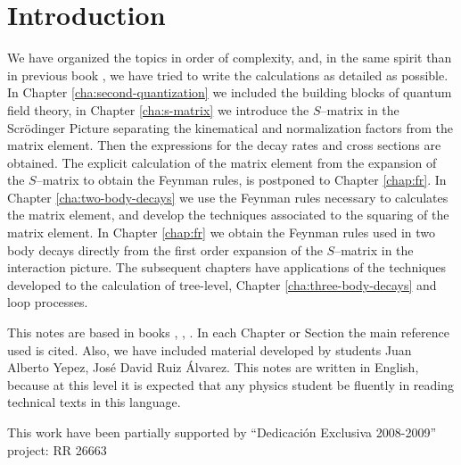 
\chapter{Introduction}
\label{cha:introduction} %
We have organized the topics in order of complexity, and, in the same
spirit than in  previous book \cite{lsm}, we have tried to write the
calculations as detailed as possible. In
Chapter 
\ref{cha:second-quantization} %
we included the building blocks
of quantum field theory, in Chapter 
\ref{cha:s-matrix} %
we introduce
the $S$--matrix in the Scr\"odinger Picture separating the kinematical
and normalization factors from the matrix element. Then the expressions
for the decay rates and cross sections are obtained. The explicit
calculation of the matrix element from the expansion of the
$S$--matrix to obtain the Feynman rules, is postponed to Chapter
\ref{chap:fr}. %
In Chapter 
\ref{cha:two-body-decays} %
we use the Feynman
rules necessary to calculates the matrix element, and develop the
techniques associated to the squaring of the matrix element. In
Chapter 
\ref{chap:fr} %
we obtain the Feynman rules used in two body
decays directly from the first order expansion of the $S$--matrix in
the interaction picture. The subsequent chapters have applications of
the techniques developed to the calculation of tree-level, 
Chapter 
\ref{cha:three-body-decays} %
and loop processes.


This notes are based in books \cite{Maggiore:2005qv}, \cite{Mandl:1985bg}, \cite{Lahiri:2005sm}.  In each Chapter or Section the main reference used is cited. Also, we have included material developed by students Juan Alberto Yepez, Jos\'e David Ruiz \'Alvarez. This notes are written in English, because at this level it is expected that any physics student be fluently in reading technical texts in this language.

This work have been partially supported by ``Dedicaci\'on Exclusiva 2008-2009''  project: RR 26663

